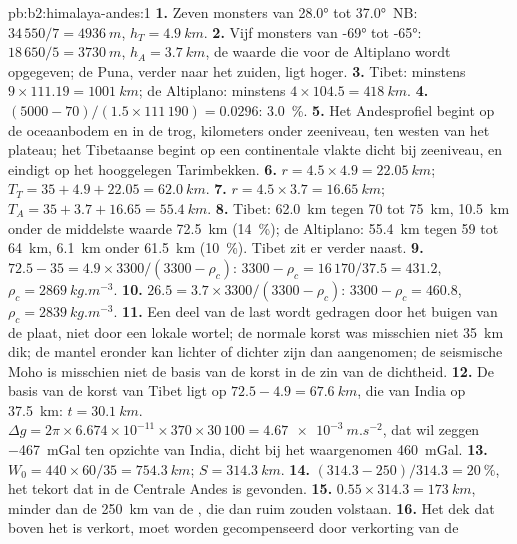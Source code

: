 \begin{solution}{pb:b2:himalaya-andes:1}
\textbf{1.} Zeven monsters van \ang{28.0} tot \ang{37.0}~NB: $34\,550/7 = \qty{4936}{m}$, $h_T
= \qty{4.9}{km}$.
\textbf{2.} Vijf monsters van \ang{-69} tot \ang{-65}: $18\,650/5 = \qty{3730}{m}$, $h_A =
\qty{3.7}{km}$, de waarde die voor de Altiplano wordt opgegeven; de Puna, verder naar het zuiden, ligt hoger.
\textbf{3.} Tibet: minstens $9\times111.19 = \qty{1001}{km}$; de Altiplano: minstens $4\times
104.5 = \qty{418}{km}$.
\textbf{4.} $(5000 - 70)/(1.5\times111\,190) = 0.0296$: \qty{3.0}{\percent}.
\textbf{5.} Het Andesprofiel begint op de oceaanbodem en in de trog, kilometers onder
zeeniveau, ten westen van het plateau; het Tibetaanse begint op een continentale vlakte dicht bij zeeniveau,
en eindigt op het hooggelegen Tarimbekken.
\textbf{6.} $r = 4.5\times4.9 = \qty{22.05}{km}$; $T_T = 35 + 4.9 + 22.05 = \qty{62.0}{km}$.
\textbf{7.} $r = 4.5\times3.7 = \qty{16.65}{km}$; $T_A = 35 + 3.7 + 16.65 = \qty{55.4}{km}$.
\textbf{8.} Tibet: \qty{62.0}{km} tegen 70 tot \qty{75}{km}, \qty{10.5}{km} onder de middelste
waarde \qty{72.5}{km} (\qty{14}{\percent}); de Altiplano: \qty{55.4}{km} tegen 59 tot
\qty{64}{km}, \qty{6.1}{km} onder \qty{61.5}{km} (\qty{10}{\percent}). Tibet zit er verder naast.
\textbf{9.} $72.5 - 35 = 4.9\times3300/(3300 - \rho_c)$: $3300 - \rho_c = 16\,170/37.5 =
431.2$, $\rho_c = \qty{2869}{kg.m^{-3}}$.
\textbf{10.} $26.5 = 3.7\times3300/(3300 - \rho_c)$: $3300 - \rho_c = 460.8$, $\rho_c =
\qty{2839}{kg.m^{-3}}$.
\textbf{11.} Een deel van de last wordt gedragen door het buigen van de plaat, niet door een lokale wortel; de
normale korst was misschien niet \qty{35}{km} dik; de mantel eronder kan lichter of dichter zijn
dan aangenomen; de seismische Moho is misschien niet de basis van de korst in de zin van de dichtheid.
\textbf{12.} De basis van de korst van Tibet ligt op $72.5 - 4.9 = \qty{67.6}{km}$, die van India op
\qty{37.5}{km}: $t = \qty{30.1}{km}$. $\Delta g = 2\pi\times6.674\times10^{-11}\times370\times
30\,100 = \qty{4.67e-3}{m.s^{-2}}$, dat wil zeggen \qty{-467}{mGal} ten opzichte van India, dicht bij het
waargenomen \qty{460}{mGal}.
\textbf{13.} $W_0 = 440\times60/35 = \qty{754.3}{km}$; $S = \qty{314.3}{km}$.
\textbf{14.} $(314.3 - 250)/314.3 = \qty{20}{\percent}$, het tekort dat in de Centrale
Andes is gevonden.
\textbf{15.} $0.55\times314.3 = \qty{173}{km}$, minder dan de \qty{250}{km} van de , die dan ruim zouden volstaan.
\textbf{16.} Het dek dat boven het  is verkort, moet worden gecompenseerd door verkorting van de

\end{solution}
